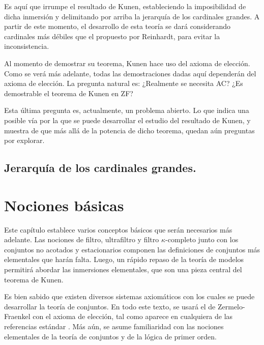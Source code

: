 Es aquí que irrumpe el resultado de Kunen,
estableciendo la imposibilidad de dicha inmersión
y delimitando por arriba la jerarquía de los cardinales
grandes. A partir de este momento, el desarrollo
de esta teoría se dará considerando cardinales más
débiles que el propuesto por Reinhardt,
para evitar la inconsistencia.

Al momento de demostrar su teorema, Kunen hace
uso del axioma de elección. Como se verá
más adelante, todas las demostraciones dadas aquí
dependerán del axioma de elección.
La pregunta natural es: ¿Realmente se necesita AC?
¿Es demostrable el teorema de Kunen en ZF?

Esta última pregunta es, actualmente, un problema abierto.
Lo que indica una posible vía por la que se puede desarrollar
el estudio del resultado de Kunen, y muestra de que más allá
de la potencia de dicho teorema, quedan aún preguntas por explorar.

\section*{Jerarquía de los cardinales grandes.}

\fi
\mainmatter
\ifbasicos
\chapter{Nociones básicas}

Este capítulo establece varios conceptos básicos que serán necesarios
más adelante. Las nociones de filtro, ultrafiltro y filtro $\kappa$-completo
junto con los conjuntos no acotados y estacionarios componen las definiciones de
conjuntos más elementales que harán falta.
Luego, un rápido repaso de la teoría de modelos permitirá abordar las inmersiones
elementales, que son una pieza central del teorema de Kunen.

Es bien sabido que existen diversos sistemas axiomáticos
con los cuales se puede desarrollar la teoría de conjuntos.
En todo este texto, se usará el de Zermelo-Fraenkel con el axioma de elección, tal como
aparece en cualquiera de las referencias estándar \autocite{kunen_set_2013,jech_set_2003}.
Más aún, se asume familiaridad con las nociones elementales de la teoría de conjuntos
y de la lógica de primer orden.


